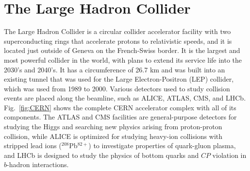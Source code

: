 \section{The Large Hadron Collider}
\label{sec:LHC}

The Large Hadron Collider is a circular collider accelerator facility with two superconducting rings that accelerate protons to relativistic speeds, and it is located just outside of Geneva on the French-Swiss border.
It is the largest and most powerful collider in the world, with plans to extend its service life into the 2030's and 2040's.
It has a circumference of 26.7 km and was built into an existing tunnel that was used for the Large Electron-Positron (LEP) collider, which was used from 1989 to 2000.
Various detectors used to study collision events are placed along the beamline, such as ALICE, ATLAS, CMS, and LHCb.
Fig.~\ref{fig:CERN} shows the complete CERN accelerator complex with all of its components.
The ATLAS and CMS facilities are general-purpose detectors for studying the Higgs and searching new physics arising from proton-proton collision, while ALICE is optimized for studying heavy-ion collisions with stripped lead ions ($^{208}$Pb$^{82+}$) to investigate properties of quark-gluon plasma, and LHCb is designed to study the physics of bottom quarks and $CP$ violation in $b$-hadron interactions.

